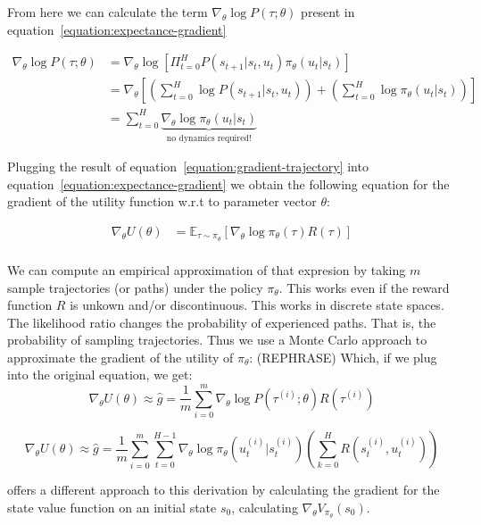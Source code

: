 \documentclass{../main.tex}{subfiles}
\begin{document}
From here we can calculate the term $\nabla_{\theta} \log P(\tau ; \theta)$ present in equation~\ref{equation:expectance-gradient}

\begin{equation}\label{equation:gradient-trajectory}
\begin{aligned}
\nabla_{\theta} \log P(\tau ; \theta) & = \nabla_{\theta} \log [\Pi_{t=0}^{H} P(s_{t+1} | s_t, u_t) \pi_{\theta}(u_t | s_t)] \\
 & = \nabla_{\theta} [(\sum_{t=0}^{H} \log P(s_{t+1} | s_t, u_t)) + (\sum_{t=0}^{H} \log \pi_{\theta}(u_t | s_t))] \\ 
 & = \sum_{t=0}^{H} \underbrace{\nabla_{\theta} \log \pi_{\theta}(u_t | s_t)}_\textrm{no dynamics required!}
\end{aligned}
\end{equation}

Plugging the result of equation~\ref{equation:gradient-trajectory} into equation~\ref{equation:expectance-gradient} we obtain the following equation for the gradient of the utility function w.r.t to parameter vector $\theta$:

\begin{equation}
\begin{aligned}
\nabla_{\theta} U(\theta) & = \mathbb{E}_{\tau \sim \pi_{\theta}} [\nabla_{\theta} \log \pi_{\theta}(\tau) R(\tau)] \\
\end{aligned}
\end{equation}

We can compute an empirical approximation of that expresion by taking $m$ sample trajectories (or paths) under the policy $\pi_{\theta}$. This works even if the reward function $R$ is unkown and/or discontinuous. This works in discrete state spaces. The likelihood ratio changes the probability of experienced paths. That is, the probability of sampling trajectories. Thus we use a Monte Carlo approach to approximate the gradient of the utility of $\pi_{\theta}$: (REPHRASE)
Which, if we plug into the original equation, we get:
\begin{equation}\label{equation:expectance-gradient-vanilla}
\nabla_{\theta}U(\theta) \approx \hat{g} = \frac{1}{m} \sum_{i = 0}^{m} \nabla_{\theta} \log P(\tau^{(i)} ; \theta) R(\tau^{(i)})
\end{equation}

\begin{equation}
\nabla_{\theta}U(\theta) \approx \hat{g} = \frac{1}{m} \sum_{i = 0}^{m} \sum_{t=0}^{H-1} \nabla_{\theta} \log \pi_{\theta}(u_t^{(i)} | s_t^{(i)}) (\sum_{k=0}^{H}R(s_t^{(i)}, u_t^{(i)}))
\end{equation}

\cite{Sutton1999} offers a different approach to this derivation by calculating the gradient for the state value function on an initial state $s_0$, calculating $\nabla_{\theta} V_{\pi_{\theta}}(s_0)$.
\end{document}
